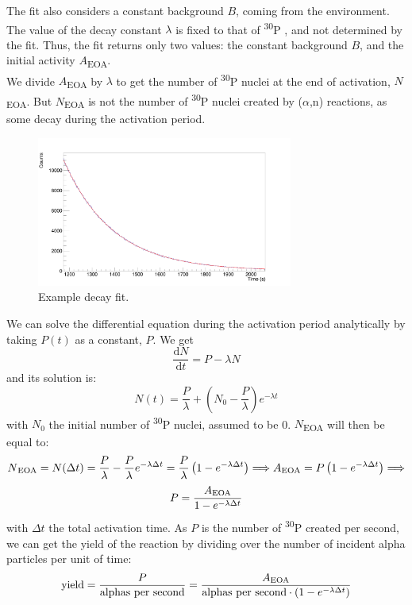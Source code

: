 \documentclass[a4paper,12pt]{report}
\newcommand{\dif}{\text{d}}
\newcommand{\ddt}[1]{\frac{\dif #1}{\dif t}}
\newcommand{\an}{($\alpha$,n) }
\newcommand{\Piso}{\textsuperscript{30}P }
\begin{document}
The fit also considers a constant background $B$, coming from the environment.
The value of the decay constant $\lambda$ is fixed to that of \Piso, and not determined by the fit.
Thus, the fit returns only two values: the constant background $B$, and the initial activity $A$\textsubscript{EOA}.
\\

We divide $A$\textsubscript{EOA} by $\lambda$ to get the number of \Piso nuclei at the end of activation, $N$\textsubscript{EOA}.
But $N$\textsubscript{EOA} is not the number of \Piso nuclei created by \an reactions, as some decay during the activation period.

\begin{figure}[H]
	\centering
	\includegraphics[width=0.75\textwidth]{example_decay_fit.png}
	\caption{Example decay fit.}
	\label{example_decay_fit}
\end{figure}

We can solve the differential equation during the activation period analytically by taking $P(t)$ as a constant, $P$.
We get
\[ \ddt{N} = P -\lambda N  \]
and its solution is:
\begin{equation}
	N(t) = \frac{P}{\lambda} + \left(  N_0 - \frac{P}{\lambda}  \right) e^{-\lambda t}
\end{equation}
with $N_0$ the initial number of \Piso nuclei, assumed to be \num{0}.
$N$\textsubscript{EOA} will then be equal to:
\[ N\textsubscript{EOA} =N(\Delta t) = \frac{P}{\lambda} - \frac{P}{\lambda} e^{-\lambda \Delta t} = \frac{P}{\lambda} \left(1 - e^{-\lambda \Delta t} \right)\Longrightarrow A\textsubscript{EOA}=P\left(1-e^{-\lambda\Delta t}\right)\Longrightarrow \]
\begin{equation}
	P = \frac{A\textsubscript{EOA}}{1 - e^{-\lambda \Delta t}}
\end{equation}
with $\Delta t$ the total activation time.
As $P$ is the number of \Piso created per second, we can get the yield of the reaction by dividing over the number of incident alpha particles per unit of time:
\begin{equation}
	\text{yield} = \frac{P}{\text{alphas per second}} = \frac{A\textsubscript{EOA}}{\text{alphas per second} \cdot \left(1 - e^{-\lambda \Delta t} \right)}
\end{equation}
\end{document}
